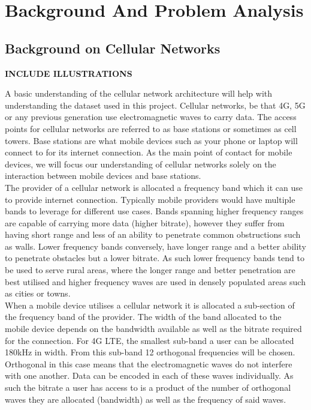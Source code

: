 \chapter{Background And Problem Analysis}


\section{Background on Cellular Networks}
\textbf{INCLUDE ILLUSTRATIONS}

A basic understanding of the cellular network architecture will help with understanding the dataset used in this project. Cellular networks, be that 4G, 5G or any previous generation use electromagnetic waves to carry data. The access points for cellular networks are referred to as base stations or sometimes as cell towers. Base stations are what mobile devices such as your phone or laptop will connect to for its internet connection. As the main point of contact for mobile devices, we will focus our understanding of cellular networks solely on the interaction between mobile devices and base stations. \\

The provider of a cellular network is allocated a frequency band which it can use to provide internet connection. Typically mobile providers would have multiple bands to leverage for different use cases. Bands spanning higher frequency ranges are capable of carrying more data (higher bitrate), however they suffer from having short range and less of an ability to penetrate  common obstructions such as walls. Lower frequency bands conversely, have longer range and a better ability to penetrate obstacles but a lower bitrate. As such lower frequency bands tend to be used to serve rural areas, where the longer range and better penetration are best utilised and higher frequency waves are used in densely populated areas such as cities or towns. \\

When a mobile device utilises a cellular network it is allocated a sub-section of the frequency band of the provider. The width of the band allocated to the mobile device depends on the bandwidth available as well as the bitrate required for the connection. For 4G LTE, the smallest sub-band a user can be allocated 180kHz in width. From this sub-band 12 orthogonal frequencies will be chosen. Orthogonal in this case means that the electromagnetic waves do not interfere with one another. Data can be encoded in each of these waves individually. As such the bitrate a user has access to is a product of the number of orthogonal waves they are allocated (bandwidth) as well as the frequency of said waves. \\

